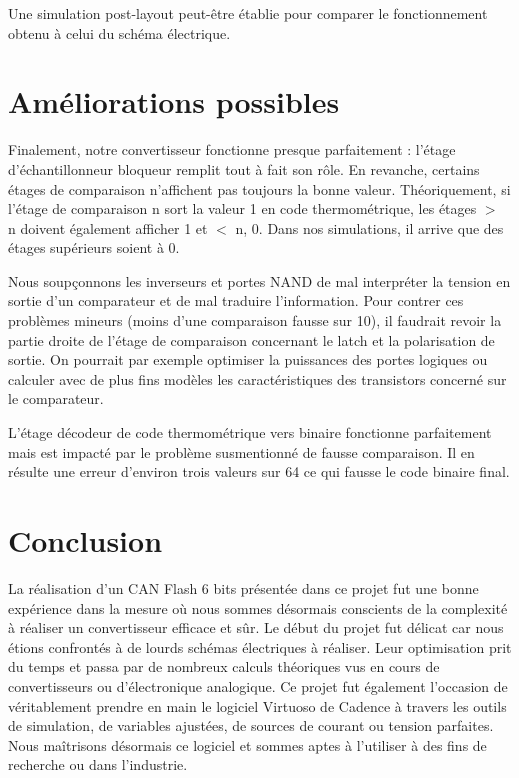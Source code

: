 \documentclass[11pt]{article}
\begin{document}
Une simulation post-layout peut-\^etre \'etablie pour comparer le fonctionnement obtenu \`a celui du sch\'ema \'electrique.

\clearpage

\section{Am\'eliorations possibles}

Finalement, notre convertisseur fonctionne presque parfaitement : l'\'etage d'\'echantillonneur bloqueur remplit tout \`a fait son r\^ole.
En revanche, certains \'etages de comparaison n'affichent pas toujours la bonne valeur. Th\'eoriquement, si l'\'etage de comparaison n sort
la valeur 1 en code thermom\'etrique, les \'etages $>$ n doivent \'egalement afficher 1 et $<$ n, 0.
Dans nos simulations, il arrive que des \'etages sup\'erieurs soient \`a 0.

Nous soup\c connons les inverseurs et portes NAND de mal interpr\'eter la tension en sortie d'un comparateur et de mal traduire l'information.
Pour contrer ces probl\`emes mineurs (moins d'une comparaison fausse sur 10), il faudrait revoir la partie droite de l'\'etage de comparaison
concernant le latch et la polarisation de sortie. On pourrait par exemple optimiser la puissances des portes logiques ou calculer avec de
plus fins mod\`eles les caract\'eristiques des transistors concern\'e sur le comparateur.

L'\'etage d\'ecodeur de code thermom\'etrique vers binaire fonctionne parfaitement mais est impact\'e par le probl\`eme susmentionn\'e de fausse comparaison.
Il en r\'esulte une erreur d'environ trois valeurs sur 64 ce qui fausse le code binaire final.

\section{Conclusion}

La r\'ealisation d'un CAN Flash 6 bits pr\'esent\'ee dans ce projet fut une bonne exp\'erience dans la mesure o\`u nous sommes d\'esormais conscients
de la complexit\'e \`a r\'ealiser un convertisseur efficace et s\^ur.
Le d\'ebut du projet fut d\'elicat car nous \'etions confront\'es \`a de lourds sch\'emas \'electriques \`a r\'ealiser. Leur optimisation prit du temps et
passa par de nombreux calculs th\'eoriques vus en cours de convertisseurs ou d'\'electronique analogique.
Ce projet fut \'egalement l'occasion de v\'eritablement prendre en main le logiciel Virtuoso de Cadence \`a travers les outils de simulation,
 de variables ajust\'ees, de sources de courant ou tension parfaites. Nous maîtrisons d\'esormais ce logiciel et sommes aptes \`a l'utiliser \`a
 des fins de recherche ou dans l'industrie.
\end{document}
